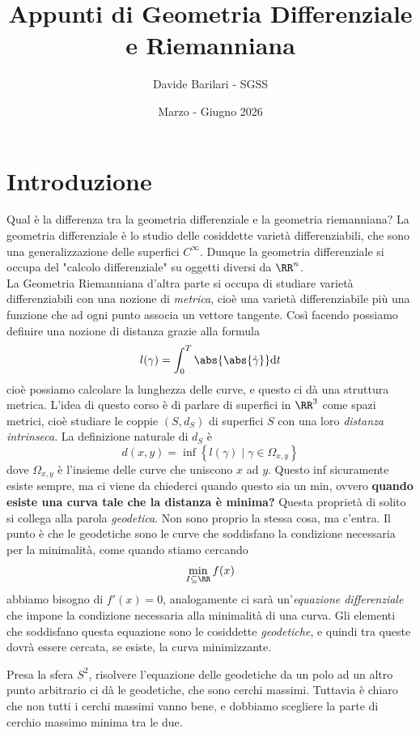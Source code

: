 \documentclass[11pt]{scrartcl}
\newcommand{\dif}{\text{d}}
\begin{document}
	\title{Appunti di Geometria Differenziale e Riemanniana}
	\subtitle{Davide Barilari - SGSS}
	\date{Marzo - Giugno 2026}
	
	
	\maketitle
	
	\tableofcontents
	
	\newpage
	
	\section{Introduzione}
	
	Qual è la differenza tra la geometria differenziale e la geometria riemanniana? La geometria differenziale è lo studio delle cosiddette varietà differenziabili, che sono una generalizzazione delle superfici $C^\infty$. Dunque la geometria differenziale si occupa del "calcolo differenziale" su oggetti diversi da $\RR^n$. \\
	La Geometria Riemanniana d'altra parte si occupa di studiare varietà differenziabili con una nozione di \textit{metrica}, cioè una varietà differenziabile più una funzione che ad ogni punto associa un vettore tangente. Così facendo possiamo definire una nozione di distanza grazie alla formula
	$$l(\gamma)=\int_0^T\abs{\abs{\dot{\gamma}}}\dif t$$
	cioè possiamo calcolare la lunghezza delle curve, e questo ci dà una struttura metrica. L'idea di questo corso è di parlare di superfici in $\RR^3$ come spazi metrici, cioè studiare le coppie $(S,d_S)$ di superfici $S$ con una loro \textit{distanza intrinseca}. La definizione naturale di $d_S$ è
	$$d(x,y)=\inf \left\{l(\gamma)\mid \gamma\in \Omega_{x,y}\right\}$$
	dove $\Omega_{x,y}$ è l'insieme delle curve che uniscono $x$ ad $y$. Questo inf sicuramente esiste sempre, ma ci viene da chiederci quando questo sia un min, ovvero \textbf{quando esiste una curva tale che la distanza è minima?} Questa proprietà di solito si collega alla parola \textit{geodetica}. Non sono proprio la stessa cosa, ma c'entra. Il punto è che le geodetiche sono le curve che soddisfano la condizione necessaria per la minimalità, come quando stiamo cercando
	$$\min_{I\subseteq \RR}f(x) $$
	abbiamo bisogno di $f'(x)=0$, analogamente ci sarà un'\textit{equazione differenziale} che impone la condizione necessaria alla minimalità di una curva. Gli elementi che soddisfano questa equazione sono le cosiddette \textit{geodetiche}, e quindi tra queste dovrà essere cercata, se esiste, la curva minimizzante. 
	\begin{example}
		Presa la sfera $S^2$, risolvere l'equazione delle geodetiche da un polo ad un altro punto arbitrario ci dà le geodetiche, che sono cerchi massimi. Tuttavia è chiaro che non tutti i cerchi massimi vanno bene, e dobbiamo scegliere la parte di cerchio massimo minima tra le due.
	\end{example}
	
\end{document}
